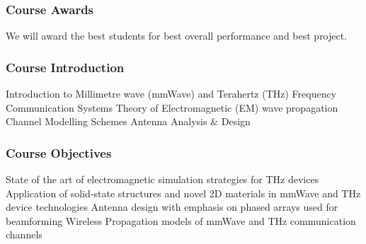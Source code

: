 \documentclass[10pt, compress]{beamer}
\begin{document}
\begin{frame}
  \frametitle{Course Awards}
  \begin{outline}
    \1 We will award the best students for best overall performance and best project. 
  \end{outline}
  \begin{figure}
   \hfil
  \end{figure}
\end{frame}
\begin{frame}[fragile]
  \frametitle{Course Introduction}
\begin{outline}
  \1 Introduction to Millimetre wave (mmWave) and Terahertz (THz) Frequency Communication Systems
  \1 Theory of Electromagnetic (EM) wave propagation
  \1 Channel Modelling Schemes
  \1 Antenna Analysis \& Design
\end{outline}
\end{frame}
\begin{frame}[fragile]
  \frametitle{Course Objectives}
\begin{outline}[itemize]
  \1 State of the art of electromagnetic simulation strategies for THz devices
  \1 Application of solid-state structures and novel 2D materials in mmWave and THz device technologies
  \1 Antenna design with emphasis on phased arrays used for beamforming
  \1 Wireless Propagation models of mmWave and THz communication channels
\end{outline}
\end{frame}
\end{document}
